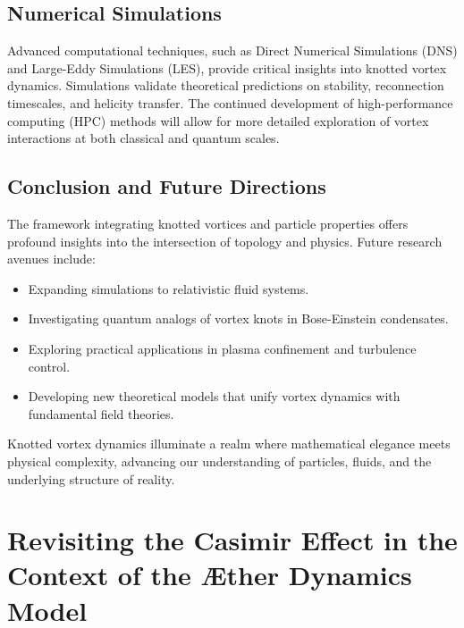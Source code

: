 \documentclass[a4paper,10pt]{article}
\begin{document}
\subsection*{Numerical Simulations}


Advanced computational techniques, such as Direct Numerical Simulations (DNS) and Large-Eddy Simulations (LES), provide critical insights into knotted vortex dynamics. Simulations validate theoretical predictions on stability, reconnection timescales, and helicity transfer. The continued development of high-performance computing (HPC) methods will allow for more detailed exploration of vortex interactions at both classical and quantum scales.


\subsection*{Conclusion and Future Directions}


The framework integrating knotted vortices and particle properties offers profound insights into the intersection of topology and physics. Future research avenues include:


\begin{itemize}

\item Expanding simulations to relativistic fluid systems.

\item Investigating quantum analogs of vortex knots in Bose-Einstein condensates.

\item Exploring practical applications in plasma confinement and turbulence control.

\item Developing new theoretical models that unify vortex dynamics with fundamental field theories.

\end{itemize}

Knotted vortex dynamics illuminate a realm where mathematical elegance meets physical complexity, advancing our understanding of particles, fluids, and the underlying structure of reality.


    

    \section{Revisiting the Casimir Effect in the Context of the Æther Dynamics Model}
\end{document}
